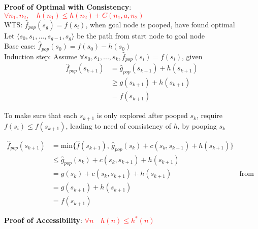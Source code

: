 \documentclass[10pt,landscape]{article}
\begin{document}
\begin{multicols}{2}
\textbf{Proof of Optimal with Consistency}: \textcolor{red}{$\forall n_1, n_2, \quad h(n_1) \le h(n_2) + C(n_1, a, n_2)$}\\
WTS: $\hat{f}_{pop} (s_g) = f(s_i)$, when goal node is pooped, have found optimal \\
Let $\langle s_0, s_1, ..., s_{g-1}, s_g \rangle$ be the path from start node to goal node \\
Base case: $\hat{f}_{pop} (s_0) = f(s_0) - h(s_0)$ \\
Induction step: Assume $\forall s_0, s_1, ..., s_k, \hat{f}_{pop} (s_i) = f(s_i)$, given
$$
\begin{align*}
    \hat{f}_{pop} (s_{k+1}) &= \hat{g}_{pop} (s_{k+1}) + h(s_{k+1}) \\
                            &\ge g(s_{k+1}) + h(s_{k+1}) \\
                            &= f(s_{k+1})
\end{align*}
$$

To make sure that each $s_{k+1}$ is only explored after pooped $s_k$, require $f(s_i) \le f(s_{k+1})$, leading to need of consistency of $h$, by pooping $s_k$

$$
\begin{align*}
    \hat{f}_{pop} (s_{k+1}) &= \text{min} \{\hat{f} (s_{k+1}), \, \hat{g}_{pop} (s_{k}) + c(s_k, s_{k+1}) + h(s_{k+1}) \} \\
                            &\le \hat{g}_{pop} (s_{k}) + c(s_k, s_{k+1}) + h(s_{k+1}) \\
                            &= g (s_{k}) + c(s_k, s_{k+1}) + h(s_{k+1}) &\text{from IH} \\
                            &= g (s_{k+1}) + h(s_{k+1}) \\
                            &= f(s_{k+1})
\end{align*}
$$

\textbf{Proof of Accessibility}: \textcolor{red}{$\forall n \quad h(n) \le h^*(n)$} \\


\end{multicols}
\end{document}

